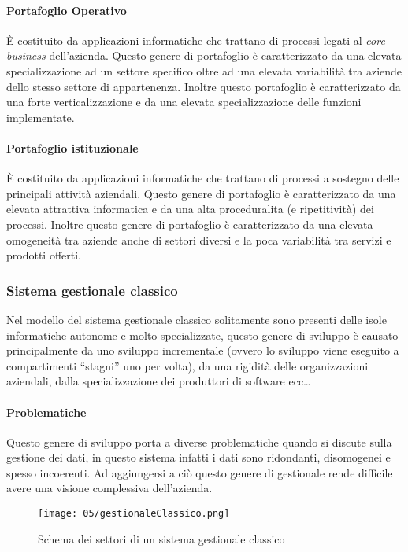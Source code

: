         \paragraph{Portafoglio Operativo} È costituito da applicazioni informatiche che trattano di processi legati al \textit{core-business} dell'azienda. Questo genere di portafoglio è caratterizzato da una elevata specializzazione ad un settore specifico oltre ad una elevata variabilità tra aziende dello stesso settore di appartenenza. Inoltre questo portafoglio è caratterizzato da una forte verticalizzazione e da una elevata specializzazione delle funzioni implementate.
        \paragraph{Portafoglio istituzionale} È costituito da applicazioni informatiche che trattano di processi a sostegno delle principali attività aziendali. Questo genere di portafoglio è caratterizzato da una elevata attrattiva informatica e da una alta proceduralita (e ripetitività) dei processi. Inoltre questo genere di portafoglio è caratterizzato da una elevata omogeneità tra aziende anche di settori diversi e la poca variabilità tra servizi e prodotti offerti.
    \subsubsection{Sistema gestionale classico}
        Nel modello del sistema gestionale classico solitamente sono presenti delle isole informatiche autonome e molto specializzate, questo genere di sviluppo è causato principalmente da uno sviluppo incrementale (ovvero lo sviluppo viene eseguito a compartimenti ``stagni'' uno per volta), da una rigidità delle organizzazioni aziendali, dalla specializzazione dei produttori di software ecc\dots
        \paragraph{Problematiche} Questo genere di sviluppo porta a diverse problematiche quando si discute sulla gestione dei dati, in questo sistema infatti i dati sono ridondanti, disomogenei e spesso incoerenti. Ad aggiungersi a ciò questo genere di gestionale rende difficile avere una visione complessiva dell'azienda.
        \begin{figure}[H]
            \centering
            \texttt{[image: 05/gestionaleClassico.png]}
            \caption{Schema dei settori di un sistema gestionale classico}
        \end{figure}
